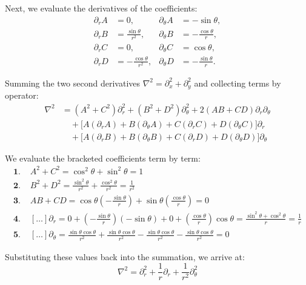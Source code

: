 \documentclass[11pt, letterpaper]{article}
\begin{document}
Next, we evaluate the derivatives of the coefficients:
\begin{align*}
\partial_r A &= 0, & \partial_\theta A &= -\sin\theta, \\
\partial_r B &= \frac{\sin\theta}{r^2}, & \partial_\theta B &= -\frac{\cos\theta}{r}, \\
\partial_r C &= 0, & \partial_\theta C &= \cos\theta, \\
\partial_r D &= -\frac{\cos\theta}{r^2}, & \partial_\theta D &= -\frac{\sin\theta}{r}.
\end{align*}

Summing the two second derivatives $\nabla^2 = \partial_x^2 + \partial_y^2$ and collecting terms by operator:
\begin{align*}
\nabla^2 &= (A^2+C^2)\partial_r^2 + (B^2+D^2)\partial_\theta^2 + 2(AB+CD)\partial_r\partial_\theta \\[4pt]
&\quad +\big[A(\partial_r A)+B(\partial_\theta A)+C(\partial_r C)+D(\partial_\theta C)\big]\partial_r \\[4pt]
&\quad +\big[A(\partial_r B)+B(\partial_\theta B)+C(\partial_r D)+D(\partial_\theta D)\big]\partial_\theta
\end{align*}

We evaluate the bracketed coefficients term by term:
\begin{align*}
\textbf{1. } & A^2+C^2 = \cos^2\theta+\sin^2\theta = 1 \\[6pt]
\textbf{2. } & B^2+D^2 = \frac{\sin^2\theta}{r^2}+\frac{\cos^2\theta}{r^2} = \frac{1}{r^2} \\[6pt]
\textbf{3. } & AB+CD = \cos\theta\left(-\frac{\sin\theta}{r}\right)+\sin\theta\left(\frac{\cos\theta}{r}\right) = 0 \\[6pt]
\textbf{4. } & [\dots]\partial_r = 0 + \left(-\frac{\sin\theta}{r}\right)(-\sin\theta) + 0 + \left(\frac{\cos\theta}{r}\right)\cos\theta = \frac{\sin^2\theta + \cos^2\theta}{r} = \frac{1}{r} \\[6pt]
\textbf{5. } & [\dots]\partial_\theta = \frac{\sin\theta\cos\theta}{r^2} + \frac{\sin\theta\cos\theta}{r^2} - \frac{\sin\theta\cos\theta}{r^2} - \frac{\sin\theta\cos\theta}{r^2} = 0
\end{align*}

Substituting these values back into the summation, we arrive at:
\begin{equation}
\nabla^2 = \partial_r^2 + \frac{1}{r}\partial_r + \frac{1}{r^2}\partial_\theta^2
\end{equation}
\end{document}
